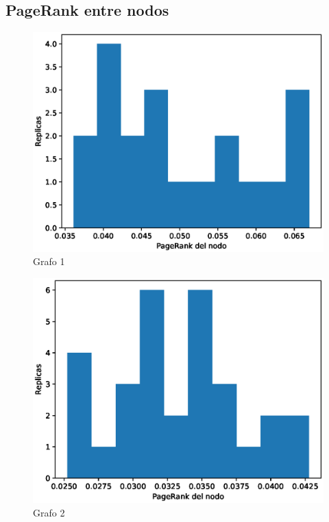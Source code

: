 \documentclass{article}
\begin{document}
\subsection{PageRank entre nodos}
\begin{figure}[H]
    \includegraphics[scale=0.6]{hist-excentricidad-1}
    \caption{Grafo 1}
    \label{fig:matriz}
\end{figure}
\begin{figure}[H]
    \includegraphics[scale=0.6]{hist-excentricidad-2}
    \caption{Grafo 2}
    \label{fig:matriz}
\end{figure}
\end{document}
